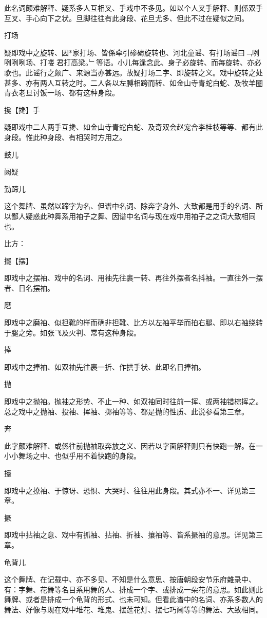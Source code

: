 \documentclass{zhvt-classic}
\begin{document}
此名词颇难解释、疑系多人互相叉、手戏中不多见。如以个人叉手解释、则係双手互叉、手心向下之状。旦脚往往有此身段、花旦尤多、但此不过在疑似之间。

  打场 

疑即戏中之旋转、因*家打场、皆係牵引碜碡旋转也、河北童谣、有打场谣曰﹁咧咧咧咧场、打喽𢾶君打高梁。﹂等语。小儿每逢念此、身子必旋转、而每旋转、亦必歌也。此谣行之颇广、来源当亦甚远。故疑打场二字、即旋转之义。戏中旋转之处甚多、亦有两人互转之时。二人各以左膊相跨而转、如金山寺青蛇白蛇、及牧羊圈青衣老旦讨饭一场、都有这种身段。

  攙【搀】手 

疑即戏中二人两手互搀、如金山寺青蛇白蛇、及奇双会赵宠合李桂枝等等、都有此身段。惟此种身段、有相哭时方用之。

  鼓儿

阙疑

  勤蹄儿

这个舞牌、虽然以蹄字为名、但谱中名词、除奔字身外、大致都是用手的名词、所以鄙人疑惑此种舞系用袖子之舞、因谱中名词与现在戏中用袖子之之词大致相同也。

比方：

  擺【摆】
  

即戏中之摆袖、戏中的名词、用袖先往裹一转、再往外摆者名抖袖。一直往外一摆者、日名摆袖。

  磨

即戏中之磨袖、似担靴的样而确非担靴、比方以左袖平举而拍右腿、即以右袖绕转于腿之旁。如张飞及火判、常有这种身段。

  捧 

即戏中之捧袖、如双袖先往裹一折、作拱手状、此即名日捧袖。

  抛

即戏中之抛袖。抛袖之形势、不止一种、如双袖同时往前一挥、或两袖错棕挥之。总之戏中之抛袖、投袖、挥袖、掷袖等等、都是抛的性质、此说参看第三章。

  奔 

此字颇难解释、或係往前抛袖取奔放之义、因若以字面解释则只有快跑一解。在一小小舞场之中、也似乎用不着快跑的身段。

  擡

即戏中之撩袖、于惊讶、恐惧、大哭时、往往用此身段。其式亦不一、详见第三章。

  撅

即戏中拈袖之意、戏中有抓袖、拈袖、折袖、攘袖等、皆系撅袖的意思。详见第三章。

  龟背儿

这个舞牌、在记载中、亦不多见、不知是什么意思、按唐朝段安节乐府雜录中、有：字舞、花舞等名目系用舞的人、排成一个字、或排成一朵花的意思。如此则此舞牌、或者是排成一个龟背的形式、也未可知。但看此谱中的名词、亦系多数人的舞法、好像与现在戏中堆花、堆鬼、摆莲花灯、摆七巧阃等等的舞法、大致相同。
\end{document}
